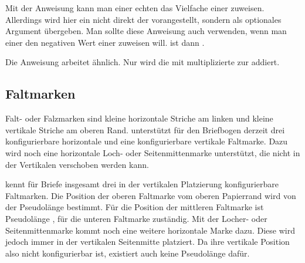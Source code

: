 \begin{Declaration}
\end{Declaration}
Mit der Anweisung
 kann man
einer echten  das Vielfache einer  zuweisen.
Allerdings wird hier ein  nicht direkt der 
vorangestellt, sondern als optionales Argument übergeben. Man sollte diese
Anweisung auch verwenden, wenn man einer  den negativen Wert
einer  zuweisen will. %
\iffalse %
  Als \PName{Faktor} kann dann wahlweise ein Minuszeichen oder \PValue{-1}
  verwendet werden. 
%
\else %
   ist dann .
%
\fi 
%
Die Anweisung 
arbeitet ähnlich. Nur wird die mit  multiplizierte
 zur  addiert.%
%
\EndIndexGroup

\subsection{Faltmarken}
\BeginIndexGroup
{}%

Falt- oder Falzmarken sind kleine horizontale Striche am linken und kleine
vertikale Striche am oberen Rand. \KOMAScript{} unterstützt für den Briefbogen
derzeit drei konfigurierbare horizontale und eine konfigurierbare vertikale
Faltmarke. Dazu wird noch eine horizontale Loch- oder Seitenmittenmarke
unterstützt, die nicht in der Vertikalen verschoben werden kann.


\begin{Declaration}
\end{Declaration}
\KOMAScript{} kennt für Briefe  insgesamt drei in der vertikalen
Platzierung konfigurierbare Faltmarken. Die Position der oberen Faltmarke vom
oberen Papierrand wird von der Pseudolänge 
bestimmt. Für die Position der mittleren Faltmarke ist Pseudolänge
, für die unteren
Faltmarke  zuständig. Mit der
Locher- oder Seitenmittenmarke kommt noch eine weitere
horizontale Marke dazu. Diese wird jedoch immer in der vertikalen Seitenmitte
platziert. 
\iftrue%
Da ihre vertikale Position also nicht konfigurierbar ist, existiert
auch keine Pseudolänge dafür.
\fi

